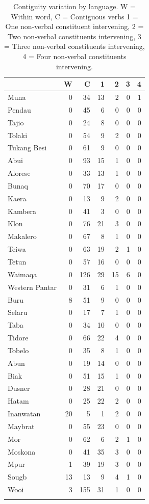 \begin{table}
\begin{tabular}{lrrrrrr}
  \lsptoprule
 & W & C & 1 & 2 & 3 & 4 \tabularnewline 
  \hline
Muna &   0 &  34 &  13 &   2 &   0 &   1 \tabularnewline 
  Pendau &   0 &  45 &   6 &   0 &   0 &   0 \tabularnewline 
  Tajio &   0 &  24 &   8 &   0 &   0 &   0 \tabularnewline 
  Tolaki &   0 &  54 &  9 &   2 &   0 &   0 \tabularnewline 
  Tukang Besi &   0 &  61 &   9 &   0 &   0 &   0 \tabularnewline \hline
  Abui &   0 &  93 &  15 &   1 &   0 &   0 \tabularnewline 
  Alorese &   0 &  33 &  13 &   1 &   0 &   0 \tabularnewline 
  Bunaq &   0 &  70 &  17 &   0 &   0 &   0 \tabularnewline 
  Kaera &   0 &  13 &  9 &   2 &   0 &   0 \tabularnewline 
  Kambera &   0 &  41 &   3 &   0 &   0 &   0 \tabularnewline 
  Klon &   0 &  76 &  21 &   3 &   0 &   0 \tabularnewline 
  Makalero &   0 &  67 &  8 &   1 &   0 &   0 \tabularnewline 
  Teiwa &   0 &  63 &  19 &   2 &  1 &   0 \tabularnewline 
  Tetun &   0 &  57 &  16 &   0 &   0 &   0 \tabularnewline 
  Waimaqa &   0 & 126 &  29 &  15 &   6 &   0 \tabularnewline 
  Western Pantar &   0 &  31 &   6 &   1 &   0 &   0 \tabularnewline \hline
  Buru & 8 & 51 & 9 & 0 & 0 & 0 \tabularnewline
  Selaru &   0 &  17 &  7 &  1 &   0 &   0 \tabularnewline 
  Taba &   0 &  34 &  10 &   0 &   0 &   0 \tabularnewline 
  Tidore & 0 & 66 & 22 & 4 & 0 & 0 \tabularnewline
  Tobelo &   0 &  35 &  8 &   1 &   0 &   0 \tabularnewline 
\hline
  Abun &   0 &  19 &  14 &   0 &   0 &   0 \tabularnewline 
  Biak &   0 &  51 &  15 &   1 &   0 &   0 \tabularnewline 
  Dusner &   0 &  28 &  21 &   0 &   0 &   0 \tabularnewline 
  Hatam &   0 &  25 &  22 &   2 &   0 &   0 \tabularnewline 
  Inanwatan &  20 &  5 &   1 &   2 &   0 &   0 \tabularnewline
  Maybrat &   0 &  55 &  23 &   0 &   0 &   0 \tabularnewline 
  Mor &   0 &  62 &  6 &   2 &   1 &   0 \tabularnewline 
  Moskona &   0 &  41 &  35 &   3 &   0 &   0 \tabularnewline 
  Mpur &   1 &  39 &  19 &   3 &   0 &   0 \tabularnewline 
  Sougb &  13 &   13 &  9 &   4 &   1 &   0 \tabularnewline 
  Wooi &   3 & 155 &  31 &   1 &   0 &   0\tabularnewline 
   \lspbottomrule
\end{tabular}
\caption[Contiguity variation by language]{Contiguity variation by language. W = Within word, C = Contiguous verbs 1 = One non-verbal constituent intervening, 2 = Two non-verbal constituents intervening, 3 = Three non-verbal constituents intervening, 4 = Four non-verbal constituents intervening.}
\label{table:Contiguity_per_lang}
\end{table}

